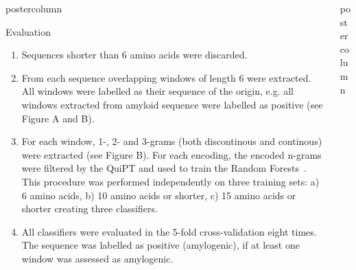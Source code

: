 \documentclass[final]{beamer}\usepackage[]{graphicx}\usepackage[]{color}
\newlength{\columnheight}
\begin{document}
\begin{frame}
\begin{columns}
\begin{column}{.485\textwidth}
\begin{beamercolorbox}[center,wd=\textwidth]{postercolumn}
\begin{minipage}[T]{.95\textwidth}
{\begin{block}{Evaluation}
\begin{enumerate}[1.]
\item Sequences shorter than 6 amino acids were discarded.
\item From each sequence overlapping windows of length 6 were extracted. All windows were labelled as their sequence of the origin, e.g. all windows extracted from amyloid sequence were labelled as positive (see Figure A and B).
\item For each window, 1-, 2- and 3-grams (both discontinous and continous) were extracted (see Figure B). For each encoding, the encoded n-grams were filtered by the QuiPT and used to train the Random Forests~\citep{liaw_classification_2002}. This procedure was performed independently on three training sets: a) 6 amino acids, b) 10 amino acids or shorter, c) 15 amino acids or shorter creating three classifiers.
\item All classifiers were evaluated in the 5-fold cross-validation eight times. The sequence was labelled as positive (amylogenic), if at least one window was assessed as amylogenic.
\end{enumerate}

\end{block}
\vfill



}
\end{minipage}
\end{beamercolorbox}
\end{column}



\begin{column}{.525\textwidth}
\begin{beamercolorbox}[center,wd=\textwidth]{postercolumn}
\begin{minipage}[T]{.95\textwidth}  
\parbox[t][\columnheight]{\textwidth}
{


}
\end{minipage}
\end{beamercolorbox}
\end{column}
\end{columns}
\end{frame}
\end{document}

